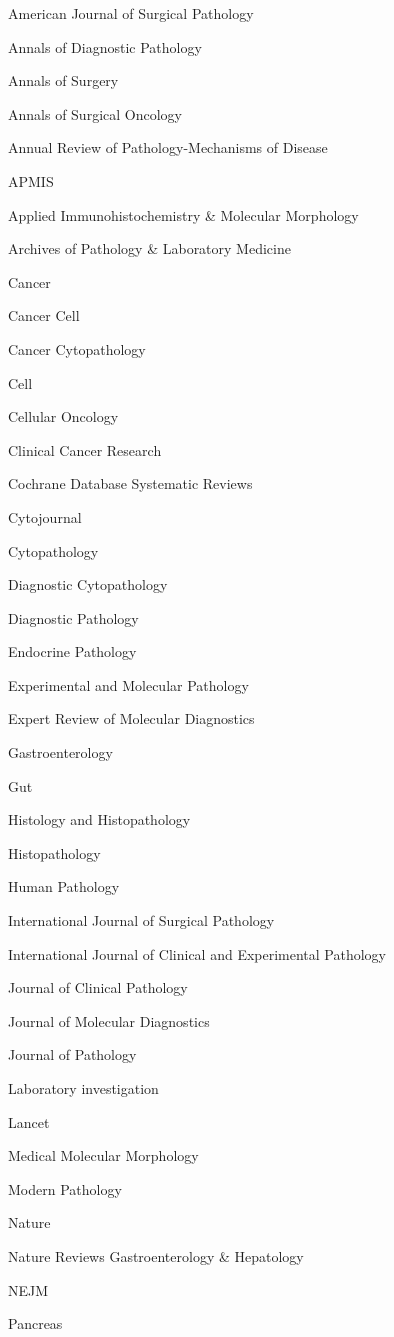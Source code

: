 \documentclass[]{article}
\begin{document}
American Journal of Surgical Pathology

Annals of Diagnostic Pathology

Annals of Surgery

Annals of Surgical Oncology

Annual Review of Pathology-Mechanisms of Disease

APMIS

Applied Immunohistochemistry \& Molecular Morphology

Archives of Pathology \& Laboratory Medicine

Cancer

Cancer Cell

Cancer Cytopathology

Cell

Cellular Oncology

Clinical Cancer Research

Cochrane Database Systematic Reviews

Cytojournal

Cytopathology

Diagnostic Cytopathology

Diagnostic Pathology

Endocrine Pathology

Experimental and Molecular Pathology

Expert Review of Molecular Diagnostics

Gastroenterology

Gut

Histology and Histopathology

Histopathology

Human Pathology

International Journal of Surgical Pathology

International Journal of Clinical and Experimental Pathology

Journal of Clinical Pathology

Journal of Molecular Diagnostics

Journal of Pathology

Laboratory investigation

Lancet

Medical Molecular Morphology

Modern Pathology

Nature

Nature Reviews Gastroenterology \& Hepatology

NEJM

Pancreas
\end{document}
